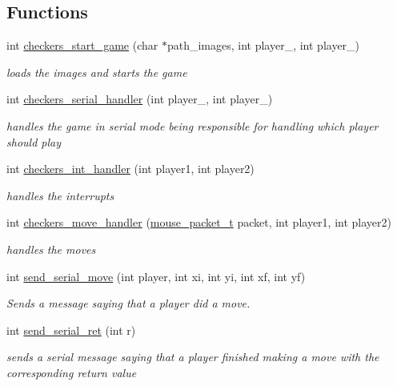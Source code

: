 \subsection*{Functions}
\begin{DoxyCompactItemize}
\item 
int \hyperlink{group___checkers_gad95d8a331ab0758ace223ea301a57f7f}{checkers\+\_\+start\+\_\+game} (char $\ast$path\+\_\+images, int player\+\_, int player\+\_)
\begin{DoxyCompactList}\small\item\em loads the images and starts the game \end{DoxyCompactList}\item 
int \hyperlink{group___checkers_gaf1aa642150939b8b1d104fe437a9d135}{checkers\+\_\+serial\+\_\+handler} (int player\+\_, int player\+\_)
\begin{DoxyCompactList}\small\item\em handles the game in serial mode being responsible for handling which player should play \end{DoxyCompactList}\item 
int \hyperlink{group___checkers_ga61f35c6c9bba94dcd5028e185f3ae3f6}{checkers\+\_\+int\+\_\+handler} (int player1, int player2)
\begin{DoxyCompactList}\small\item\em handles the interrupts \end{DoxyCompactList}\item 
int \hyperlink{group___checkers_gac38396bd73b19b176b4016524f63f8aa}{checkers\+\_\+move\+\_\+handler} (\hyperlink{structmouse__packet__t}{mouse\+\_\+packet\+\_\+t} packet, int player1, int player2)
\begin{DoxyCompactList}\small\item\em handles the moves \end{DoxyCompactList}\item 
int \hyperlink{group___checkers_gac0cf60fd44a44bbb1a7c9ff7ec0d998b}{send\+\_\+serial\+\_\+move} (int player, int xi, int yi, int xf, int yf)
\begin{DoxyCompactList}\small\item\em Sends a message saying that a player did a move. \end{DoxyCompactList}\item 
int \hyperlink{group___checkers_gaa082b9cac17a99c54ac6fa5ac40c660d}{send\+\_\+serial\+\_\+ret} (int r)
\begin{DoxyCompactList}\small\item\em sends a serial message saying that a player finished making a move with the corresponding return value \end{DoxyCompactList}\item 

\end{DoxyCompactItemize}
